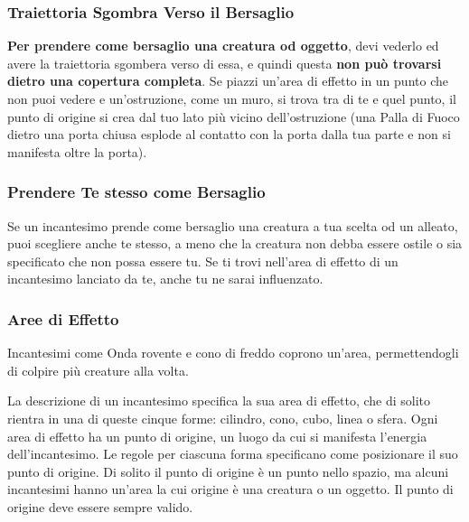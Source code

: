 \begin{multicols}{2}
\subsubsection*{Traiettoria Sgombra Verso il Bersaglio}

\textbf{Per prendere come bersaglio una creatura od oggetto}, devi vederlo ed avere la traiettoria sgombera verso di essa, e quindi questa \textbf{non può trovarsi dietro una copertura completa}. Se piazzi un'area di effetto in un punto che non puoi vedere e un'ostruzione, come un muro, si trova tra di te e quel punto, il punto di origine si crea dal tuo lato più vicino dell'ostruzione (una Palla di Fuoco dietro una porta chiusa esplode al contatto con la porta dalla tua parte e non si manifesta oltre la porta).

\subsubsection*{Prendere Te stesso come Bersaglio}

Se un incantesimo prende come bersaglio una creatura a tua scelta od un alleato, puoi scegliere anche te stesso, a meno che la creatura non debba essere ostile o sia specificato che non possa essere tu. Se ti trovi nell'area di effetto di un incantesimo lanciato da te, anche tu ne sarai influenzato.


\subsubsection{Aree di Effetto}\label{magieareedieffetto}

Incantesimi come Onda rovente e cono di freddo coprono un'area, permettendogli di colpire più creature alla volta.

La descrizione di un incantesimo specifica la sua area di effetto, che di solito rientra in una di queste cinque forme: cilindro, cono, cubo, linea o sfera. Ogni area di effetto ha un punto di origine, un luogo da cui si manifesta l'energia dell'incantesimo. Le regole per ciascuna forma specificano come posizionare il suo punto di origine. Di solito il punto di origine è un punto nello spazio, ma alcuni incantesimi hanno un'area la cui origine è una creatura o un oggetto. Il punto di origine deve essere sempre valido.



\end{multicols}
